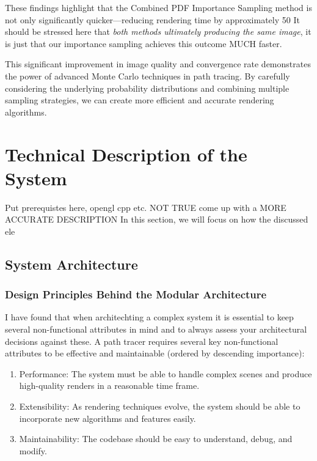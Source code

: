 \documentclass[12pt]{article}
\begin{document}
These findings highlight that the Combined PDF Importance Sampling method is not only significantly quicker—reducing rendering time by approximately 50%
It should be stressed here that \textit{both methods ultimately producing the same image}, it is just that our importance sampling achieves this outcome MUCH faster.

This significant improvement in image quality and convergence rate demonstrates the power of advanced Monte Carlo techniques in path tracing. By carefully considering the underlying probability distributions and combining multiple sampling strategies, we can create more efficient and accurate rendering algorithms.

\section{Technical Description of the System}
\label{sec:system-description}

Put prerequistes here, opengl cpp etc.
NOT TRUE come up with a MORE ACCURATE DESCRIPTION
In this section, we will focus on how the discussed ele

\subsection{System Architecture}

\subsubsection{Design Principles Behind the Modular Architecture}

I have found that when architechting a complex system it is essential to keep several non-functional attributes in mind and to always assess your architectural decisions against these.
A path tracer requires several key non-functional attributes to be effective and maintainable (ordered by descending importance):

\begin{enumerate}
    \item Performance: The system must be able to handle complex scenes and produce high-quality renders in a reasonable time frame.
    \item Extensibility: As rendering techniques evolve, the system should be able to incorporate new algorithms and features easily.
    \item Maintainability: The codebase should be easy to understand, debug, and modify.
\end{enumerate}
\end{document}
